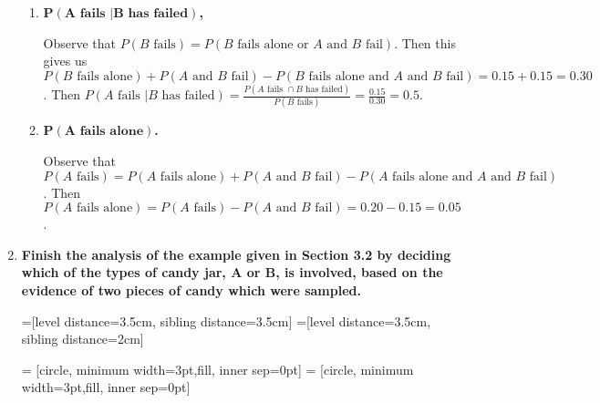 \documentclass[10pt, oneside]{article}   	%
\theoremstyle{definition}
\begin{document}
\begin{enumerate}[label=3.\arabic*]
	\begin{enumerate}
	\item  \begin{tcolorbox}[
	  colback=Cerulean!5!white,
	  colframe=Cerulean!75!black]
	\textbf{$\bm{P(A \text{ fails } | B \text{ has failed})}$,}
	\end{tcolorbox}
	
	Observe that $P(B \text{ fails}) = P(B \text{ fails alone or } A \text{ and } B \text{ fail})$. Then this gives us $P(B \text{ fails alone}) + P(A \text{ and } B \text{ fail}) - P(B \text{ fails alone and } A \text{ and } B \text{ fail}) = 0.15 + 0.15 = 0.30$. Then $P(A \text{ fails } | B \text{ has failed}) = \frac{P(A \text{ fails } \cap B \text{ has failed})}{P(B \text{ fails})} = \frac{0.15}{0.30} = \boxed{0.5}$.
	
	\item  \begin{tcolorbox}[
	  colback=Cerulean!5!white,
	  colframe=Cerulean!75!black]
	\textbf{$\bm{P(A \text{ fails alone})}$.}
	\end{tcolorbox}
	
	Observe that $P(A \text{ fails}) = P(A \text{ fails alone}) + P(A \text{ and } B \text{ fail}) - P(A \text{ fails alone and } A \text{ and } B \text{ fail})$. Then $P(A \text{ fails alone}) = P(A \text{ fails}) - P(A \text{ and } B \text{ fail}) = 0.20 - 0.15 = \boxed{0.05}$.
	\end{enumerate}

\newpage
\item  \begin{tcolorbox}[
  colback=Cerulean!5!white,
  colframe=Cerulean!75!black]
\textbf{Finish the analysis of the example given in Section 3.2 by deciding which of the types of candy jar, $\bm{A}$ or $\bm{B}$, is involved, based on the evidence of two pieces of candy which were sampled.}
\end{tcolorbox}

=[level distance=3.5cm, sibling distance=3.5cm]
=[level distance=3.5cm, sibling distance=2cm]

 = [circle, minimum width=3pt,fill, inner sep=0pt]
 = [circle, minimum width=3pt,fill, inner sep=0pt]


\end{enumerate}
\end{document}
